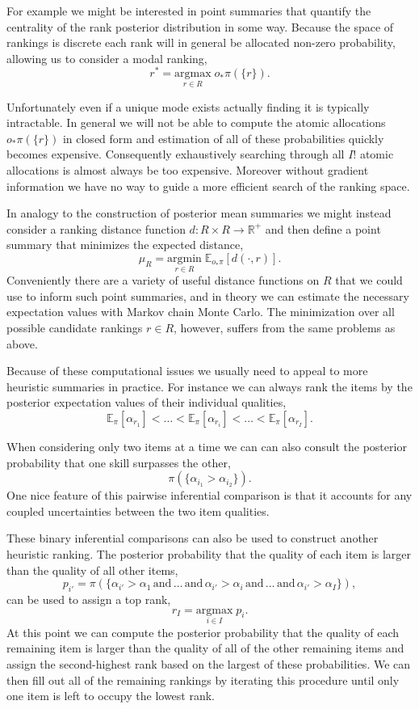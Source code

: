 \documentclass[
  letterpaper,
  DIV=11,
  numbers=noendperiod]{scrartcl}
\begin{document}
For example we might be interested in point summaries that quantify the
centrality of the rank posterior distribution in some way. Because the
space of rankings is discrete each rank will in general be allocated
non-zero probability, allowing us to consider a modal ranking, \[
r^{*} = \underset{r \in R}{\mathrm{argmax}} \; o_{*} \pi( \{ r \} ).
\]

Unfortunately even if a unique mode exists actually finding it is
typically intractable. In general we will not be able to compute the
atomic allocations \(o_{*} \pi( \{ r \} )\) in closed form and
estimation of all of these probabilities quickly becomes expensive.
Consequently exhaustively searching through all \(I!\) atomic
allocations is almost always be too expensive. Moreover without gradient
information we have no way to guide a more efficient search of the
ranking space.

In analogy to the construction of posterior mean summaries we might
instead consider a ranking distance function
\(d : R \times R \rightarrow \mathbb{R}^{+}\) and then define a point
summary that minimizes the expected distance, \[
\mu_{R}
=
\underset{r \in R}{\mathrm{argmin}} \;
\mathbb{E}_{o_{*} \pi}[ d( \cdot, r) ].
\] Conveniently there are a variety of useful distance functions on
\(R\) that we could use to inform such point summaries, and in theory we
can estimate the necessary expectation values with Markov chain Monte
Carlo. The minimization over all possible candidate rankings
\(r \in R\), however, suffers from the same problems as above.

Because of these computational issues we usually need to appeal to more
heuristic summaries in practice. For instance we can always rank the
items by the posterior expectation values of their individual qualities,
\[
\mathbb{E}_{\pi}[ \alpha_{r_{1}} ] < \ldots <
\mathbb{E}_{\pi}[ \alpha_{r_{i}} ] < \ldots <
\mathbb{E}_{\pi}[ \alpha_{r_{I}} ].
\]

When considering only two items at a time we can can also consult the
posterior probability that one skill surpasses the other, \[
\pi( \{ \alpha_{i_{1}} > \alpha_{i_{2}} \} ).
\] One nice feature of this pairwise inferential comparison is that it
accounts for any coupled uncertainties between the two item qualities.

These binary inferential comparisons can also be used to construct
another heuristic ranking. The posterior probability that the quality of
each item is larger than the quality of all other items, \[
p_{i'} = \pi( \{ \alpha_{i'} > \alpha_{1} \,
                 \text{and} \, \ldots \, \text{and} \,
                 \alpha_{i'} > \alpha_{i} \,
                 \text{and} \, \ldots \, \text{and} \,
                 \alpha_{i'} > \alpha_{I} \}),
\] can be used to assign a top rank, \[
r_{I} = \underset{i \in I}{\mathrm{argmax}} \; p_{i}.
\] At this point we can compute the posterior probability that the
quality of each remaining item is larger than the quality of all of the
other remaining items and assign the second-highest rank based on the
largest of these probabilities. We can then fill out all of the
remaining rankings by iterating this procedure until only one item is
left to occupy the lowest rank.
\end{document}
